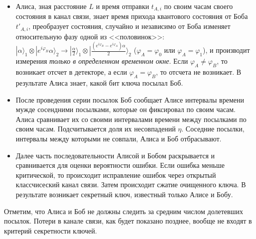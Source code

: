\begin{itemize}
  \item Алиса, зная расстояние $L$ и время отправки $t_{A,i}$ по своим часам своего состояния в канал связи, знает время прихода квантового состояния от Боба $t'_{A,i}$, преобразует состояния, случайно и независимо от Боба изменяет относительную фазу одной из <<половинок>>: 
  $|\alpha\rangle_1 \otimes |e^{i\varphi_B}\alpha\rangle_2 \rightarrow |\frac{\alpha}{2}\rangle_1 \otimes |\frac{(e^{i\varphi_B} - e^{i\varphi_A})\alpha}{2}\rangle_2$
  ($\varphi_A = \varphi_0$ или $\varphi_A = \varphi_1$), и производит измерения \textit{только в определенном временном окне}. 
  Если $\varphi_A \neq \varphi_B$, то возникает отсчет в детекторе, а если $\varphi_A = \varphi_B$, то отсчета не возникает. В результате Алиса знает, какой бит ключа посылал Боб.
  
  \item После проведения серии посылок Боб сообщает Алисе интервалы времени мужде сосендними посылками, которые он фиксировал по своим часам. Алиса сравнивает их со своими интервалами времени между посылками по своим часам. Подсчитывается доля их несовпадений $\eta$. Соседние посылки, интервалы между которыми не совпали, Алиса и Боб отбрасывают.
  
  \item Далее часть последовательности Алисой и Бобом раскрывается и сравнивается для оценки вероятности ошибки. Если ошибка меньше критической, то происходит исправление ошибок через открытый классчисеский канал связи. Затем происходит сжатие очищенного ключа. В результате возникает секретный ключ, известный только Алисе и Бобу.
\end{itemize}

Отметим, что Алиса и Боб не должны следить за средним числом долетевших посылок. Потери в канале связи, как будет показано позднее, вообще не входят в критерий секретности ключей.
\clearpage